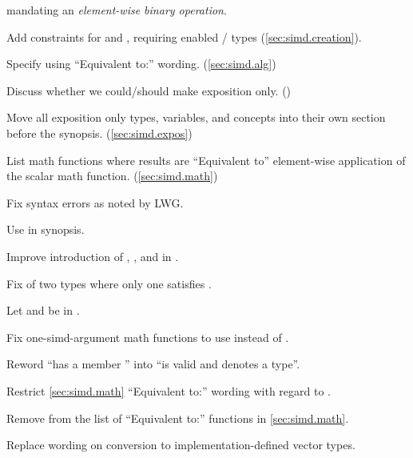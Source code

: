 \begin{revision}
  mandating an \emph{element-wise binary operation}.
\item Add constraints for  and , requiring
  enabled / types
  (\ref{sec:simd.creation}).
\item Specify  using “Equivalent to:” wording.
  (\ref{sec:simd.alg})
\item Discuss whether we could/should make  exposition only.
  ()
\item Move all exposition only types, variables, and concepts into their own
  section before the synopsis. (\ref{sec:simd.expos})
\end{revision}

\begin{revision}
\item List math functions where results are “Equivalent to” element-wise application of the scalar math function. (\ref{sec:simd.math})
\item Fix syntax errors as noted by LWG.
\item Use \seebelow in \reductionoperation synopsis.
\item Improve introduction of , , and  in \mathcommonsimd.
\item Fix \mathcommonsimd of two types where only one satisfies \mathfloatingpoint.
\item Let  and  be  in \reductionoperation.
\item Fix one-simd-argument math functions to use  instead of .
\item Reword “has a member ” into “is valid and denotes a type”.
\item Restrict \ref{sec:simd.math} “Equivalent to:” wording with regard to .
\item Remove  from the list of “Equivalent to:” functions in \ref{sec:simd.math}.
\item Replace wording on conversion to implementation-defined vector types.

\end{revision}
